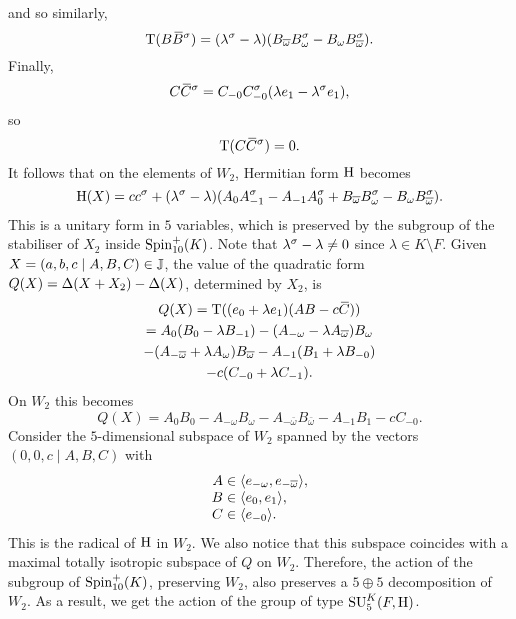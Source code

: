 and so similarly,
\begin{equation}
	\operatorname{T}(B\mathord{\mbox{\hspace*{0pt}}\,\overline{\!B\!\!\;}\!\:}\mbox{\hspace*{0pt}}^{\sigma}) = (\lambda^{\sigma} - \lambda) ( B_{\overline{\omega}} B_{\omega}^{\sigma} - 
					B_{\omega} B_{\overline{\omega}}^{\sigma} ).
\end{equation}
Finally,
\begin{equation}
	C\mathord{\mbox{\hspace*{0pt}}\,\overline{\!C\!\!\;}\!\:}\mbox{\hspace*{0pt}}^{\sigma} = C_{-0}C_{-0}^{\sigma}(\lambda e_1 - \lambda^{\sigma}e_1),
\end{equation}
so
\begin{equation}
	\operatorname{T}(C\mathord{\mbox{\hspace*{0pt}}\,\overline{\!C\!\!\;}\!\:}\mbox{\hspace*{0pt}}^{\sigma}) = 0.
\end{equation}
It follows that on the elements of $W_2$, Hermitian form $\mathrm{H}$ becomes
\begin{equation}
	\mathrm{H}(X) = c c^{\sigma} + (\lambda^{\sigma} - \lambda) ( A_0 A_{-1}^{\sigma} - A_{-1} A_0^{\sigma} + 
			B_{\overline{\omega}} B_{\omega}^{\sigma} - B_{\omega} B_{\overline{\omega}}^{\sigma}).
\end{equation}
This is a unitary form in $5$ variables, which is preserved by the subgroup of the stabiliser of $X_2$
inside $\mathrm{Spin}_{10}^+(K)$. Note that
$\lambda^{\sigma}-\lambda \neq 0$ since $\lambda \in K \setminus F$. Given $X = (a,b,c \mid A,B,C) \in \mathbb{J}$,
the value of the quadratic form $Q(X) = \Delta(X+X_2) - \Delta(X)$, determined by $X_2$, is 
\begin{multline}
	Q(X) = \operatorname{T}( (e_0 + \lambda e_1) ( AB - c\mathord{\mbox{\hspace*{0pt}}\,\overline{\!C\!\!\;}\!\:}\mbox{\hspace*{0pt}} ) ) \\
	= A_0 (B_0 - \lambda B_{-1}) - (A_{-\omega} - \lambda A_{\overline{\omega}}) B_{\omega} \\ 
	- (A_{-\overline{\omega}} + \lambda A_{\omega}) B_{\overline{\omega}} - A_{-1} (B_1 + \lambda B_{-0}) \\
	- c (C_{-0} + \lambda C_{-1}).
\end{multline}
On $W_2$ this becomes
\begin{equation}
	Q(X) = A_0 B_0 - A_{-\omega}B_{\omega} - A_{-\bar{\omega}}B_{\bar{\omega}} - A_{-1}B_1 - cC_{-0}. 
\end{equation}
Consider the $5$-dimensional subspace of $W_2$ spanned by the vectors $(0,0,c\mid A,B,C)$ with
\begin{equation}
	\begin{array}{r@{\;}c@{\;}l}
		A & \in & \langle e_{-\omega}, e_{-\bar{\omega}} \rangle, \\
		B & \in & \langle e_0, e_1 \rangle, \\
		C & \in & \langle e_{-0} \rangle. 
	\end{array}
\end{equation}
This is the radical of $\mathrm{H}$ in $W_2$. We also notice that this subspace coincides with a 
maximal totally isotropic subspace of $Q$ on $W_2$. Therefore, the action of the subgroup
of $\mathrm{Spin}_{10}^+(K)$, preserving $W_2$, also preserves a $5 \oplus 5$ decomposition of $W_2$.
As a result, we get the action of the group of type $\mathrm{SU}_5^K(F,\mathrm{H})$.

